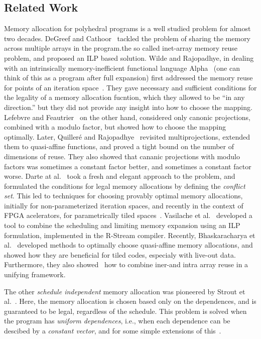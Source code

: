 \subsection{Related Work}

Memory allocation for polyhedral programs is a well studied problem for almost
two decades.  DeGreef and Cathoor~\cite{degreef-memory97} tackled the problem
of sharing the memory across multiple arrays in the program.the so called
inet-array memory reuse problem, and proposed an ILP based solution.  Wilde
and Rajopadhye, in dealing with an intrinsically memory-inefficient functional
language Alpha~\cite{mauras1989thesis} (one can think of this as a program after
full expansion) first addressed the memory reuse for points of an iteration
space~\cite{sanjay-europar96}.  They gave necessary and sufficient conditions
for the legality of a memory allocation fucntion, which they allowed to be
``in any direction.''  but they did not provide any insight into how to choose
the mapping.  Lefebvre and Feautrier~\cite{lefebvre-feautrier-pc98} on the
other hand, considered only canonic projections, combined with a modulo
factor, but showed how to choose the mapping optimally.  Later, Quiller\'e and
Rajopadhye~\cite{sanjay-toplas00} revisited multiprojections, extended them to
quasi-affine functions, and proved a tight bound on the number of dimensions
of reuse.  They also showed that cananic projections with modulo factors was
sometimes a constant factor better, and sometimes a constant factor worse.
Darte at al.~\cite{darte-lattice05} took a fresh and elegant approach to the
problem, and formulated the conditions for legal memory allocations by
defining the \emph{conflict set}.  This led to techniques for choosing
provably optimal memory allocations, initially for non-parameterized iteration
spaces, and recently in the context of FPGA acelerators, for parametrically
tiled spaces~\cite{darte2014parametric, darte2016extended}.  Vasilache et
al.~\cite{vasilache-impact12} developed a tool to combine the scheduling and
limiting memory expansion using an ILP formulation, implemented in the
R-Stream compiler.  Recently, Bhaskaracharya et
al.~\cite{bhaskaracharya-toplas16} developed methods to optimally choose
quasi-affine memory allocations, and showed how they are beneficial for tiled
codes, especialy with live-out data.  Furthermore, they also
showed~\cite{bhaskaracharya-popl16} how to combine iner-and intra array reuse
in a unifying framework.

The other \emph{schedule independent} memory allocation was pioneered by
Strout et al.~\cite{strout-etal-asplos98}.  Here, the memory allocation is
chosen based only on the dependences, and is guaranteed to be legal,
regardless of the schedule.  This problem is solved when the program has
\emph{uniform dependences}, i.e., when each dependence can be descibed by a
\emph{constant vector}, and for some simple extensions of
this~\cite{strout-etal-asplos98, sanjay-memory-2011}.

